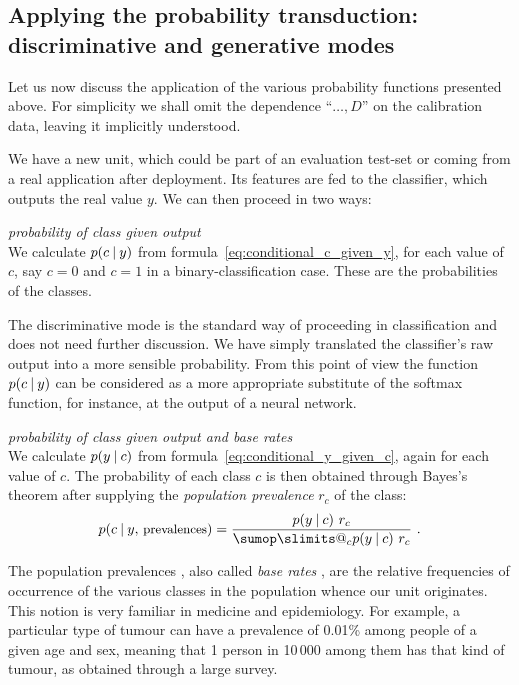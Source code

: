 \documentclass[\ifafour a4paper,12pt,\else a5paper,10pt,\fi%
onecolumn,oneside,article,%
british%
]{memoir}
\makeatletter
\theoremstyle{remark}
\theoremstyle{innote}
\def\sum{\DOTSI\sumop\slimits@}
\renewcommand*{\|}[1][]{\nonscript\:#1\vert\nonscript\:\mathopen{}}
\newcommand*{\sect}{\S}%
\newcommand*{\chap}{ch.}%
\newcommand*{\texts}[1]{\text{\small #1}}
\newcommand*{\br}{r}
\makeatother
\begin{document}
\subsection{Applying the probability transduction: discriminative and generative modes}
\label{sec:effect_transd}

Let us now discuss the application of the various probability functions presented above. For simplicity we shall omit the dependence \enquote{$\dotsc, D$} on the calibration data, leaving it implicitly understood.

We have a new unit, which could be part of an evaluation test-set or coming from a real application after deployment. Its features are fed to the classifier, which outputs the real value $y$. We can then proceed in two ways:
\begin{description}[font=\textit]
\item[Discriminative mode:] \textit{probability of class given output}\\
 We calculate $p(c \| y)$ from formula~\eqref{eq:conditional_c_given_y}, for each value of $c$, say $c=0$ and $c=1$ in a binary-classification case. These are the probabilities of the classes.
\end{description}
The discriminative mode is the standard way of proceeding in classification and does not need further discussion. We have simply translated the classifier's raw output into a more sensible probability. From this point of view the function $p(c \| y)$ can be considered as a more appropriate substitute of the softmax function, for instance, at the output of a neural network.


\begin{description}[resume, font=\textit]
\item[Generative mode:] \textit{probability of class given output and base rates}\\
  We calculate $p(y \| c)$ from formula~\eqref{eq:conditional_y_given_c}, again for each value of $c$. The probability of each class $c$ is then obtained through Bayes's theorem after supplying the \emph{population prevalence} $\br_{c}$ of the class:
  \begin{equation}
    \label{eq:bayes_baserate}
    p(c \| y,\, \texts{prevalences}) = \frac{p(y \| c)\ \br_{c}}{ \sum_{c} p(y \| c)\ \br_{c} } \ .
  \end{equation}
\end{description}
The population prevalences \autocites[\chap~3]{soxetal1988_r2013}[\sect~5.1]{huninketal2001_r2014}, also called \emph{base rates} \autocites{barhillel1980,axelsson2000}, are the relative frequencies of occurrence of the various classes in the population whence our unit originates. This notion is very familiar in medicine and epidemiology. For example, a particular type of tumour can have a prevalence of 0.01\% among people of a given age and sex, meaning that 1 person in 10\,000 among them has that kind of tumour, as obtained through a large survey.
\end{document}
